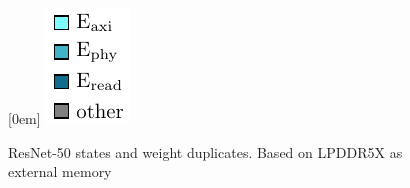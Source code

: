 \begin{figure}[hbtp]
    \centering
    \hfill
    \subcaptionbox*{}[0em]{
        \includegraphics{assets/legend.pdf}
    }
    \hfill
    \caption{ResNet-50 states and weight duplicates. Based on LPDDR5X as external memory}
    \label{fig:pies_resnet50_no_states_and_dupes_lpddr5x}
\end{figure}
